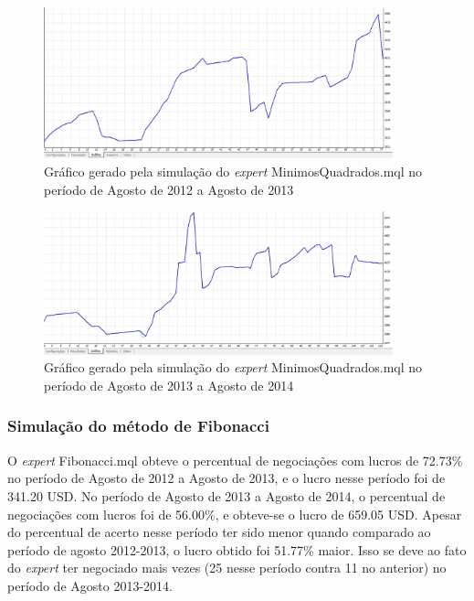 \begin{figure}[H]
\centering
\includegraphics[width=0.9\textwidth]{figuras/protocoloMinimos3}
\caption{Gráfico gerado pela simulação do \textit{expert} MinimosQuadrados.mql no período de Agosto de 2012 a Agosto de 2013}
\label{protocoloMinimos3}
\end{figure}

\begin{figure}[H]
\centering
\includegraphics[width=0.9\textwidth]{figuras/protocoloMinimos4}
\caption{Gráfico gerado pela simulação do \textit{expert} MinimosQuadrados.mql no período de Agosto de 2013 a Agosto de 2014}
\label{protocoloMinimos4}
\end{figure}

\subsubsection{Simulação do método de Fibonacci}

O \textit{expert} Fibonacci.mql obteve o percentual de negociações com lucros de 72.73\% no período de Agosto de 2012 a Agosto de 2013, e o  lucro nesse período foi de 341.20 USD.
No período de Agosto de 2013 a Agosto de 2014, o percentual de negociações com lucros foi de 56.00\%,  e obteve-se o lucro de 659.05 USD. Apesar do percentual de acerto nesse período ter sido menor quando comparado ao período de agosto 2012-2013, o lucro obtido foi 51.77\% maior. Isso se deve ao fato do \textit{expert} ter negociado mais vezes (25 nesse período contra 11 no anterior) no período de Agosto 2013-2014.

